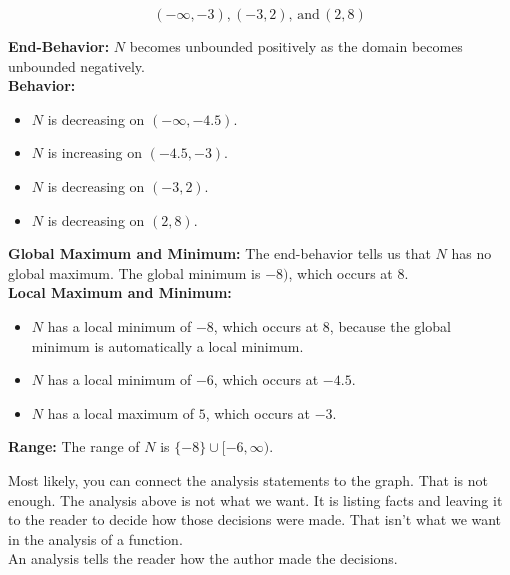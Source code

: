 \documentclass{ximera}
\begin{document}
\begin{example}
\[
(-\infty, -3), (-3, 2), \, \text{and} \, (2, 8)
\]


\textbf{End-Behavior:}  $N$ becomes unbounded positively as the domain becomes unbounded negatively.\\

\textbf{Behavior:}  

\begin{itemize}
	\item $N$ is decreasing on $(-\infty, -4.5)$.
	\item $N$ is increasing on $(-4.5, -3)$.
	\item $N$ is decreasing on $(-3, 2)$.
	\item $N$ is decreasing on $(2, 8)$.
\end{itemize}



\textbf{Global Maximum and Minimum:} The end-behavior tells us that $N$ has no global maximum.  The global minimum is $-8)$, which occurs at $8$.  \\


\textbf{Local Maximum and Minimum:} 

\begin{itemize}
	\item $N$ has a local minimum of $-8$, which occurs at $8$, because the global minimum is automatically a local minimum.
	\item $N$ has a local minimum of $-6$, which occurs at $-4.5$.
	\item $N$ has a local maximum of $5$, which occurs at $-3$.

\end{itemize}

\textbf{Range:} The range of $N$ is $\{ -8 \} \cup [-6, \infty)$. \\ 


\end{example}


Most likely, you can connect the analysis statements to the graph. That is not enough. The analysis above is not what we want.  It is listing facts and leaving it to the reader to decide how those decisions were made.  That isn't what we want in the analysis of a function. \\


An analysis tells the reader how the author made the decisions.\\
\end{document}
